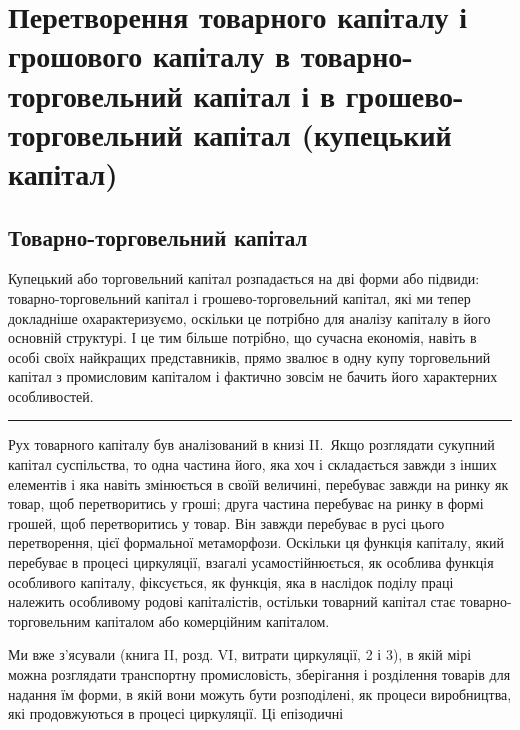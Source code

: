 \chapter{Перетворення товарного капіталу і грошового
капіталу в товарно-торговельний
капітал і в грошево-торговельний капітал
(купецький капітал)
}
\section{Товарно-торговельний капітал}

Купецький або торговельний капітал розпадається на дві
форми або підвиди: товарно-торговельний капітал і грошево-торговельний
капітал, які ми тепер докладніше охарактеризуємо,
оскільки це потрібно для аналізу капіталу в його основній структурі.
І це тим більше потрібно, що сучасна економія, навіть
в особі своїх найкращих представників, прямо звалює в одну
купу торговельний капітал з промисловим капіталом і фактично
зовсім не бачить його характерних особливостей.

\pfbreak{}

Рух товарного капіталу був аналізований в книзі II.~Якщо
розглядати сукупний капітал суспільства, то одна частина
його, яка хоч і складається завжди з інших елементів і яка навіть
змінюється в своїй величині, перебуває завжди на ринку
як товар, щоб перетворитись у гроші; друга частина перебуває
на ринку в формі грошей, щоб перетворитись у товар. Він
завжди перебуває в русі цього перетворення, цієї формальної
метаморфози. Оскільки ця функція капіталу, який перебуває
в процесі циркуляції, взагалі усамостійнюється, як особлива
функція особливого капіталу, фіксується, як функція, яка в наслідок
поділу праці належить особливому родові капіталістів,
остільки товарний капітал стає товарно-торговельним капіталом
або комерційним капіталом.

Ми вже з’ясували (книга II, розд. VI, витрати циркуляції,
2 і 3), в якій мірі можна розглядати транспортну промисловість,
зберігання і розділення товарів для надання їм форми,
в якій вони можуть бути розподілені, як процеси виробництва,
які продовжуються в процесі циркуляції. Ці епізодичні
\parbreak{}  %
